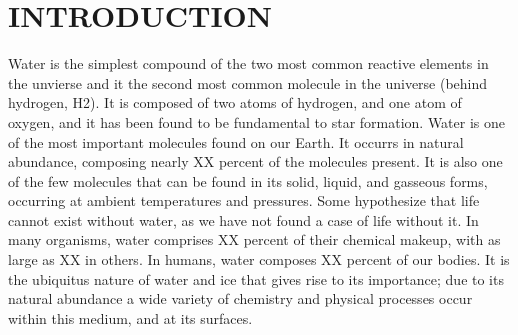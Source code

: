 \chapter{INTRODUCTION}\label{chap:intro}
%
%
%
%
%
%




Water is the simplest compound of the two most common reactive
elements in the unvierse and it the second most common molecule in the
universe (behind hydrogen, H2). It is composed of two atoms of
hydrogen, and one atom of oxygen, and it has been found to be
fundamental to star formation.  Water is one of the most important
molecules found on our Earth.  It occurrs in natural abundance,
composing nearly XX percent of the molecules present. It is also one
of the few molecules that can be found in its solid, liquid, and
gasseous forms, occurring at ambient temperatures and pressures.  Some
hypothesize that life cannot exist without water, as we have not found
a case of life without it. In many organisms, water comprises XX
percent of their chemical makeup, with as large as XX in others. In
humans, water composes XX percent of our bodies. It is the ubiquitus
nature of water and ice that gives rise to its importance; due to its
natural abundance a wide variety of chemistry and physical processes
occur within this medium, and at its surfaces.

